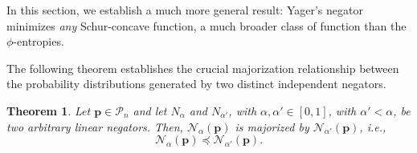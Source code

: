 \documentclass[pdflatex,sn-basic,iicol]{sn-jnl}%
\theoremstyle{thmstyleone}%
\newtheorem{theorem}{Theorem}%
\theoremstyle{thmstyletwo}%
\theoremstyle{thmstylethree}%
\newcommand{\N}{\mathcal{N}}
\newcommand{\cP}{\mathcal{P}}
\newcommand{\bp}{\mathbf{p}}
\begin{document}
In this section, we establish a much more general result: Yager's negator minimizes \textit{any} Schur-concave function, a much broader class of function than the $\phi$-entropies. %

The following theorem establishes the crucial majorization relationship between the probability distributions generated by two distinct independent negators.

\begin{theorem}\label{th:majorization}
Let $\bp\in\cP_n$ and let $N_\alpha$ and $N_{\alpha'}$, with $\alpha, \alpha'\in[0,1]$, with 
$\alpha' <\alpha$, be two arbitrary linear negators. Then, $\N_\alpha(\bp)$ is majorized by $\N_{\alpha'}(\bp)$, i.e.,
\begin{equation}\label{majalpha}
\N_\alpha(\bp)\preceq \N_{\alpha'}(\bp).
\end{equation}
\end{theorem}
\end{document}
